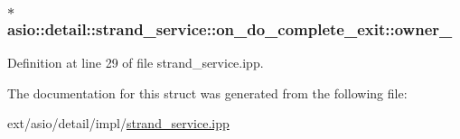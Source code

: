 \subsubsection[{owner\+\_\+}]{$\ast$ asio\+::detail\+::strand\+\_\+service\+::on\+\_\+do\+\_\+complete\+\_\+exit\+::owner\+\_\+}\label{structasio_1_1detail_1_1strand__service_1_1on__do__complete__exit_ac89a70e6bafface28bb66fa68ea18e0f}


Definition at line 29 of file strand\+\_\+service.\+ipp.



The documentation for this struct was generated from the following file\+:\begin{DoxyCompactItemize}
\item 
ext/asio/detail/impl/\hyperlink{strand__service_8ipp}{strand\+\_\+service.\+ipp}\end{DoxyCompactItemize}
